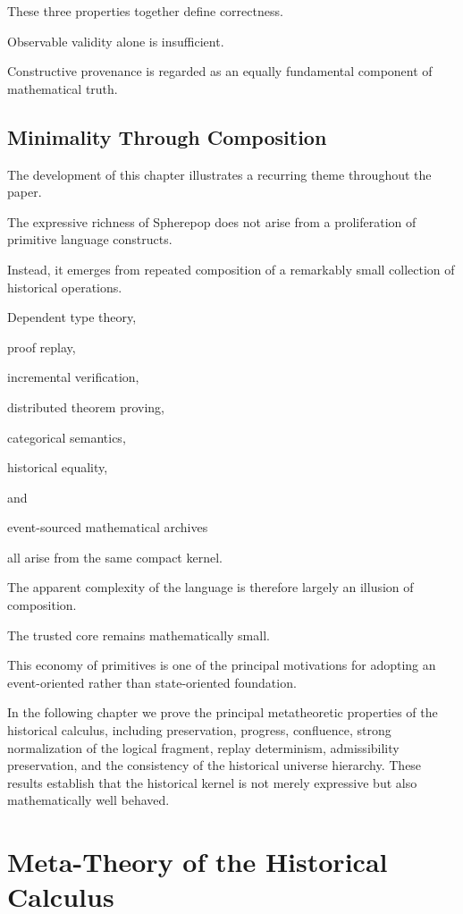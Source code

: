 \documentclass[12pt,oneside]{article}
\theoremstyle{definition}
\theoremstyle{remark}
\begin{document}
These three properties together define correctness.

Observable validity alone is insufficient.

Constructive provenance is regarded as an equally fundamental component of
mathematical truth.

\subsection{Minimality Through Composition}

The development of this chapter illustrates a recurring theme throughout the
paper.

The expressive richness of Spherepop does not arise from a proliferation of
primitive language constructs.

Instead, it emerges from repeated composition of a remarkably small collection
of historical operations.

Dependent type theory,

proof replay,

incremental verification,

distributed theorem proving,

categorical semantics,

historical equality,

and

event-sourced mathematical archives

all arise from the same compact kernel.

The apparent complexity of the language is therefore largely an illusion of
composition.

The trusted core remains mathematically small.

This economy of primitives is one of the principal motivations for adopting an
event-oriented rather than state-oriented foundation.

In the following chapter we prove the principal metatheoretic properties of the
historical calculus, including preservation, progress, confluence, strong
normalization of the logical fragment, replay determinism, admissibility
preservation, and the consistency of the historical universe hierarchy. These
results establish that the historical kernel is not merely expressive but also
mathematically well behaved.

\section{Meta-Theory of the Historical Calculus}
\end{document}
